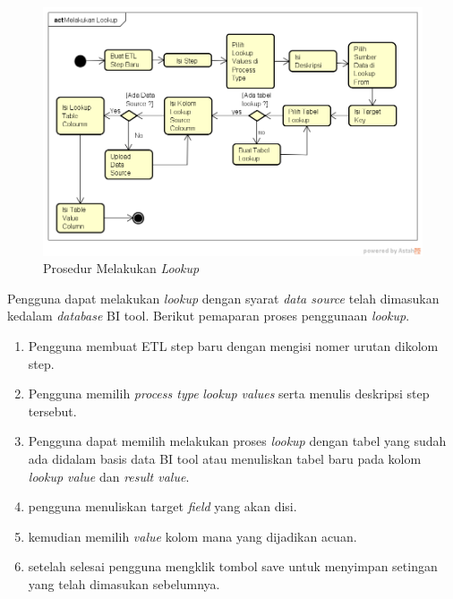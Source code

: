 	\begin{figure}[H]
	\centering
	\includegraphics[scale=0.5]{Gambar/Melakukan-Lookup}
	\caption{Prosedur Melakukan \textit{Lookup}}
	\end{figure}

	Pengguna dapat melakukan \textit{lookup} dengan syarat \textit{data source} telah dimasukan kedalam \textit{database} BI tool. Berikut pemaparan proses penggunaan \textit{lookup}.
	\begin{enumerate}
		\item Pengguna membuat ETL step baru dengan mengisi nomer urutan dikolom step.
		\item Pengguna memilih \textit{process type} \textit{lookup values} serta menulis deskripsi step tersebut.
		\item Pengguna dapat memilih melakukan proses \textit{lookup} dengan tabel yang sudah ada didalam basis data BI tool atau menuliskan tabel baru pada kolom \textit{lookup value} dan \textit{result value}.
		\item pengguna menuliskan target \textit{field} yang akan disi.
		\item kemudian memilih \textit{value} kolom mana yang dijadikan acuan.
		\item setelah selesai pengguna mengklik tombol save untuk menyimpan setingan yang telah dimasukan sebelumnya.
	\end{enumerate}

